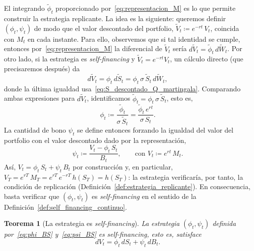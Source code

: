 \documentclass[11pt,a4paper,oneside]{report}
\theoremstyle{plain}
\newtheorem{teorema}{Teorema}[chapter]
\theoremstyle{definition}
\theoremstyle{remark}
\newcommand{\1}{\mathbf{1}}
\newcommand{\eqdef}{\coloneqq}
\begin{document}
El integrando
$\widetilde\phi_t$ proporcionado por~\eqref{eq:representacion_M} es lo
que permite construir la estrategia replicante. La idea es la
siguiente: queremos definir $(\phi_t, \psi_t)$ de modo que el valor
descontado del portfolio, $\widetilde V_t \eqdef e^{-rt}\, V_t$, coincida
con $M_t$ en cada instante. Para ello, observemos que si tal identidad
se cumple, entonces por~\eqref{eq:representacion_M} la diferencial de
$\widetilde V_t$ sería $d\widetilde V_t = \widetilde\phi_t\,
d\widetilde W_t$. Por otro lado, si la estrategia es \emph{self-financing}
y $\widetilde V_t = e^{-rt} V_t$, un cálculo directo (que precisaremos
después) da
\begin{equation*}
  d\widetilde V_t = \phi_t\, d\widetilde S_t
                  = \phi_t\, \sigma\, \widetilde S_t\, d\widetilde W_t,
\end{equation*}
donde la última igualdad usa~\eqref{eq:S_descontado_Q_martingala}.
Comparando ambas expresiones para $d\widetilde V_t$, identificamos
$\widetilde\phi_t = \phi_t\, \sigma\, \widetilde S_t$, esto es,
\begin{equation}\label{eq:phi_BS}
  \boxed{\;
    \phi_t \eqdef \frac{\widetilde\phi_t}{\sigma\, \widetilde S_t}
              = \frac{\widetilde\phi_t\, e^{rt}}{\sigma\, S_t}. \;}
\end{equation}
La cantidad de bono $\psi_t$ se define entonces forzando la igualdad
del valor del portfolio con el valor descontado dado por la
representación,
\begin{equation}\label{eq:psi_BS}
  \boxed{\;
    \psi_t \eqdef \frac{V_t - \phi_t\, S_t}{B_t},
    \qquad \text{con } V_t \eqdef e^{rt}\, M_t. \;}
\end{equation}
Así, $V_t = \phi_t\, S_t + \psi_t\, B_t$ por construcción y, en
particular, $V_T = e^{rT}\, M_T = e^{rT}\, e^{-rT}\, h(S_T) = h(S_T)$:
la estrategia verificaría, por tanto, la condición de replicación
(Definición~\ref{def:estrategia_replicante}). En consecuencia, basta verificar que $(\phi_t, \psi_t)$ es
\emph{self-financing} en el sentido de la
Definición~\ref{def:self_financing_continuo}.

\begin{teorema}[La estrategia es \emph{self-financing}]
\label{teo:replicante_self_financing}
La estrategia $(\phi_t, \psi_t)$ definida
por~\eqref{eq:phi_BS} y~\eqref{eq:psi_BS} es \emph{self-financing}, esto
es, satisface
\begin{equation*}
  dV_t = \phi_t\, dS_t + \psi_t\, dB_t.
\end{equation*}
\end{teorema}
\end{document}
